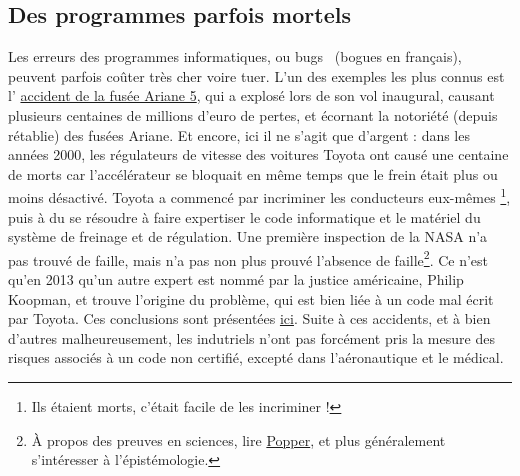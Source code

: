 \documentclass[10pt]{article}
\begin{document}
\subsection{Des programmes parfois mortels}


Les erreurs des programmes informatiques, ou \og bugs \fg~(bogues en français), peuvent parfois coûter très cher voire tuer.
L'un des exemples les plus connus est l'
\href{https://fr.wikipedia.org/wiki/Vol_501_d\%27Ariane_5}{accident de la fusée Ariane 5},
qui a explosé lors de son vol inaugural, causant plusieurs centaines de millions d'euro de pertes, et écornant
la notoriété (depuis rétablie) des fusées Ariane. Et encore, ici il ne s'agit que d'argent :
dans les années 2000, les régulateurs de vitesse des voitures Toyota ont causé une centaine de morts car
l'accélérateur se bloquait en même temps que le frein était plus ou moins désactivé.
Toyota a commencé par incriminer les conducteurs eux-mêmes \footnote{Ils étaient morts,
  c'était facile de les incriminer !}, puis à du se résoudre à faire expertiser le code informatique et le matériel du
système de freinage et de régulation. Une première inspection de la NASA n'a pas trouvé de faille, mais n'a pas non plus
prouvé l'absence de faille\footnote{
  À propos des preuves en sciences, lire \href{https://fr.wikipedia.org/wiki/Karl_Popper}{Popper}, et plus généralement
s'intéresser à l'épistémologie.}.
Ce n'est qu'en 2013 qu'un autre expert est nommé par la justice américaine, Philip Koopman, et trouve l'origine du problème, qui est bien
liée à un code mal écrit par Toyota. Ces conclusions sont présentées \href{https://users.ece.cmu.edu/~koopman/pubs/koopman14_toyota_ua_slides.pdf}{ici}.
Suite à ces accidents, et à bien d'autres malheureusement, les indutriels n'ont pas forcément pris la mesure des risques associés à un code non certifié,
excepté dans l'aéronautique et le médical.
\end{document}
